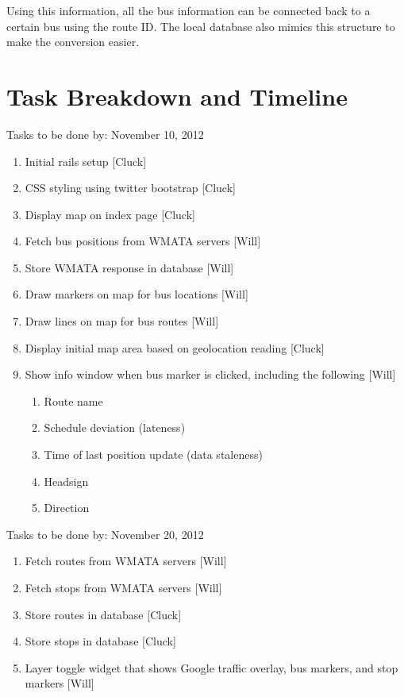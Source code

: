 \documentclass[12pt]{article}
\begin{document}
Using this information, all the bus information can be connected back to a certain bus using the route ID.  The local database also mimics this structure to make the conversion easier.  

\section*{Task Breakdown and Timeline}
\begin{description}
	\item Tasks to be done by:  November 10, 2012  	
	
	\begin{enumerate}
		\item Initial rails setup [Cluck]
		\item CSS styling using twitter bootstrap [Cluck]
		\item Display map on index page [Cluck]
		\item Fetch bus positions from WMATA servers [Will]
		\item Store WMATA response in database [Will]
		\item Draw markers on map for bus locations [Will]
		\item Draw lines on map for bus routes [Will]
		\item Display initial map area based on geolocation reading [Cluck]
		\item Show info window when bus marker is clicked, including the following [Will]
		\begin{enumerate}
			\item Route name
			\item Schedule deviation (lateness)
			\item Time of last position update (data staleness)
			\item Headsign
			\item Direction
		\end{enumerate}
	\end{enumerate}
	\item Tasks to be done by: November 20, 2012
	\begin{enumerate}
		\item Fetch routes from WMATA servers [Will]
		\item Fetch stops from WMATA servers [Will]
		\item Store routes in database [Cluck]
		\item Store stops in database [Cluck]
		\item Layer toggle widget that shows Google traffic overlay, bus markers, and stop markers [Will]

\end{enumerate}
\end{description}
\end{document}
